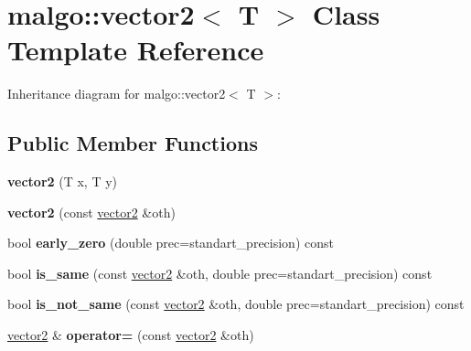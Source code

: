 \hypertarget{classmalgo_1_1vector2}{}\section{malgo\+:\+:vector2$<$ T $>$ Class Template Reference}
\label{classmalgo_1_1vector2}


Inheritance diagram for malgo\+:\+:vector2$<$ T $>$\+:
\subsection*{Public Member Functions}
\begin{DoxyCompactItemize}
\item 
{\bfseries vector2} (T x, T y)\hypertarget{classmalgo_1_1vector2_aa7e8f255c7a2e35ad1ae65c5d8c81b93}{}\label{classmalgo_1_1vector2_aa7e8f255c7a2e35ad1ae65c5d8c81b93}

\item 
{\bfseries vector2} (const \hyperlink{classmalgo_1_1vector2}{vector2} \&oth)\hypertarget{classmalgo_1_1vector2_a7a4fd2ae0a9df209d0c690fa480c250f}{}\label{classmalgo_1_1vector2_a7a4fd2ae0a9df209d0c690fa480c250f}

\item 
bool {\bfseries early\+\_\+zero} (double prec=standart\+\_\+precision) const \hypertarget{classmalgo_1_1vector2_a84aa57a20a88c61804dda3c66de074db}{}\label{classmalgo_1_1vector2_a84aa57a20a88c61804dda3c66de074db}

\item 
bool {\bfseries is\+\_\+same} (const \hyperlink{classmalgo_1_1vector2}{vector2} \&oth, double prec=standart\+\_\+precision) const \hypertarget{classmalgo_1_1vector2_a8dd3f6937950e0acf64d90b35799470b}{}\label{classmalgo_1_1vector2_a8dd3f6937950e0acf64d90b35799470b}

\item 
bool {\bfseries is\+\_\+not\+\_\+same} (const \hyperlink{classmalgo_1_1vector2}{vector2} \&oth, double prec=standart\+\_\+precision) const \hypertarget{classmalgo_1_1vector2_a642b50a4101b92421c1815b045268b4c}{}\label{classmalgo_1_1vector2_a642b50a4101b92421c1815b045268b4c}

\item 
\hyperlink{classmalgo_1_1vector2}{vector2} \& {\bfseries operator=} (const \hyperlink{classmalgo_1_1vector2}{vector2} \&oth)\hypertarget{classmalgo_1_1vector2_af984009b91c3cd04e3476c5e6cb2fd93}{}\label{classmalgo_1_1vector2_af984009b91c3cd04e3476c5e6cb2fd93}


\end{DoxyCompactItemize}
